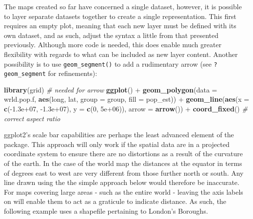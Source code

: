 \documentclass[]{article}
\newenvironment{Shaded}{}{}
\newcommand{\KeywordTok}[1]{\textcolor[rgb]{0.00,0.44,0.13}{\textbf{{#1}}}}
\newcommand{\DataTypeTok}[1]{\textcolor[rgb]{0.56,0.13,0.00}{{#1}}}
\newcommand{\DecValTok}[1]{\textcolor[rgb]{0.25,0.63,0.44}{{#1}}}
\newcommand{\FloatTok}[1]{\textcolor[rgb]{0.25,0.63,0.44}{{#1}}}
\newcommand{\CommentTok}[1]{\textcolor[rgb]{0.38,0.63,0.69}{\textit{{#1}}}}
\newcommand{\NormalTok}[1]{{#1}}
\begin{document}
The maps created so far have concerned a single dataset, however, it is possible to layer
separate datasets together to create a single representation. This first requires an empty plot, meaning that each new layer must be defined with
its own dataset, and as such, adjust the syntax a little from that presented previously. Although more code is needed, this does enable
much greater flexibility with regards to what can be included as new
layer content. Another possibility is to use \texttt{geom\_segment()}
to add a rudimentary arrow (see \texttt{?geom\_segment} for
refinements):

\begin{Shaded}
\begin{Highlighting}[]
\KeywordTok{library}\NormalTok{(grid)  }\CommentTok{# needed for arrow}
\KeywordTok{ggplot}\NormalTok{() + }\KeywordTok{geom_polygon}\NormalTok{(}\DataTypeTok{data =} \NormalTok{wrld.pop.f, }\KeywordTok{aes}\NormalTok{(long, lat, }\DataTypeTok{group =} \NormalTok{group, }\DataTypeTok{fill =} \NormalTok{pop_est)) + }
    \KeywordTok{geom_line}\NormalTok{(}\KeywordTok{aes}\NormalTok{(}\DataTypeTok{x =} \KeywordTok{c}\NormalTok{(-}\FloatTok{1.3e+07}\NormalTok{, -}\FloatTok{1.3e+07}\NormalTok{), }\DataTypeTok{y =} \KeywordTok{c}\NormalTok{(}\DecValTok{0}\NormalTok{, }\FloatTok{5e+06}\NormalTok{)), }\DataTypeTok{arrow =} \KeywordTok{arrow}\NormalTok{()) + }
    \KeywordTok{coord_fixed}\NormalTok{()  }\CommentTok{# correct aspect ratio}
\end{Highlighting}
\end{Shaded}


ggplot2's scale bar capabilities are perhaps the least advanced element
of the package. This approach will only work if the spatial data are in
a projected coordinate system to ensure there are no distortions as a
result of the curvature of the earth. In the case of the world map the
distances at the equator in terms of degrees east to west are very
different from those further north or south. Any line drawn using the
the simple approach below would therefore be inaccurate. For maps
covering large areas - such as the entire world - leaving the axis
labels on will enable them to act as a graticule to indicate distance.
As such, the following example uses a shapefile pertaining to London's
Boroughs.
\end{document}
